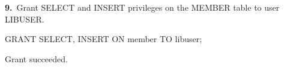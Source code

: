 \noindent\begin{minipage}{\linewidth}
\begingroup{}
{\fontsize{14}{17}\selectfont\textbf{9.}}\ Grant SELECT and INSERT privileges on the MEMBER table to user LIBUSER.\par
\endgroup\vspace{12pt}


\begin{sqlcode}
GRANT SELECT, INSERT ON member TO libuser;
\end{sqlcode}

\vspace{18pt}


\begin{sqlout}[fontsize=\small]
Grant succeeded.
\end{sqlout}
\end{minipage}\par\vspace{24pt}

